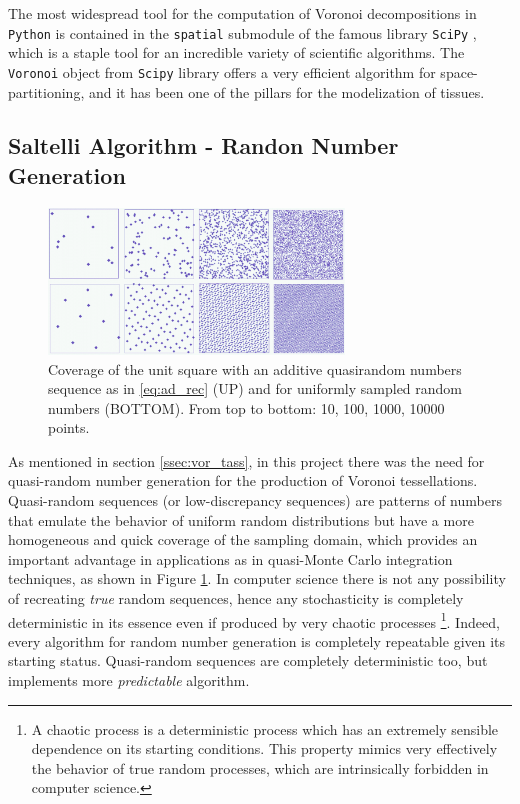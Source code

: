 The most widespread tool for the computation of Voronoi decompositions in \texttt{Python} is contained in the \texttt{spatial} submodule of the famous library \texttt{SciPy} \cite{2020SciPy-NMeth}, which is a staple tool for an incredible variety of scientific algorithms. The \texttt{Voronoi} object from \texttt{Scipy} library offers a very efficient algorithm for space-partitioning, and it has been one of the pillars for the modelization of tissues.

\subsection{Saltelli Algorithm - Randon Number Generation} \label{ssec:saltelli}
\begin{figure}
    \centering
    \includegraphics[width = 0.7\textwidth]{images/Subrandom_2D}
    \caption{Coverage of the unit square with an additive quasirandom numbers sequence as in \ref{eq:ad_rec} (UP) and for uniformly sampled random numbers (BOTTOM). From top to bottom: 10, 100, 1000, 10000 points.}
    \label{fig:Subrandom_2D}
\end{figure}
As mentioned in section \ref{ssec:vor_tass}, in this project there was the need for quasi-random number generation for the production of Voronoi tessellations. Quasi-random sequences (or low-discrepancy sequences) are patterns of numbers that emulate the behavior of uniform random distributions but have a more homogeneous and quick coverage of the sampling domain, which provides an important advantage in applications as in quasi-Monte Carlo integration techniques, as shown in Figure \ref{fig:Subrandom_2D}. In computer science there is not any possibility of recreating \textit{true} random sequences, hence any stochasticity is completely deterministic in its essence even if produced by very chaotic processes \footnote{A chaotic process is a deterministic process which has an extremely sensible dependence on its starting conditions. This property mimics very effectively the behavior of true random processes, which are intrinsically forbidden in computer science.}. Indeed, every algorithm for random number generation is completely repeatable given its starting status. Quasi-random sequences are completely deterministic too, but implements more \textit{predictable} algorithm.

